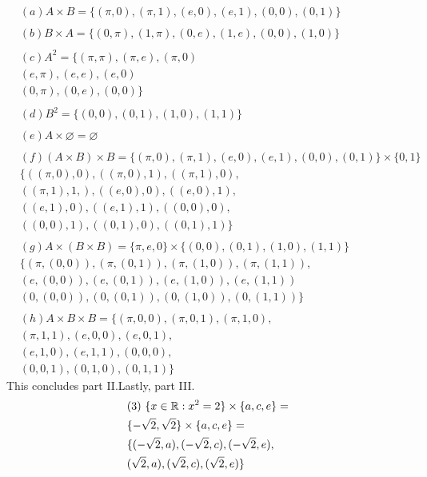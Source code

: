\begin{solution}
$$\begin{aligned}
    &(a) A\times B= \{ (\pi,0),(\pi,1),(e,0),(e,1),(0,0),(0,1) \}\\\\
    &(b) B\times A= \{ (0,\pi),(1,\pi),(0,e),(1,e),(0,0),(1,0) \}\\\\
    &(c) A^2= \{ (\pi,\pi), (\pi,e),(\pi,0)\\
    &(e,\pi),(e,e),(e,0)\\
    &(0,\pi),(0,e),(0,0) \}\\\\
    &(d) B^2= \{ (0,0),(0,1),(1,0),(1,1) \}\\\\
    &(e) A\times\varnothing=\varnothing\\\\
    &(f) (A\times B)\times B= \{ (\pi,0),(\pi,1),(e,0),(e,1),(0,0),(0,1) \}\times \{ 0,1 \}\\
    &\{  ((\pi,0),0), ((\pi,0),1), ((\pi,1),0), \\
    &((\pi,1),1,), ((e,0),0),((e,0),1),\\
    &((e,1),0),((e,1),1), ((0,0),0),\\
    &((0,0),1), ((0,1),0),((0,1),1)\}\\\\
    &(g) A\times (B\times B)= \{ \pi,e,0 \}\times \{ (0,0),(0,1),(1,0),(1,1) \}\\
    &\{ (\pi,(0,0)),(\pi,(0,1)),(\pi,(1,0)),(\pi,(1,1)),\\
    &(e,(0,0)),(e,(0,1)),(e,(1,0)),(e,(1,1))\\
    &(0,(0,0)),(0,(0,1)),(0,(1,0)),(0,(1,1)) \}\\\\
    &(h) A\times B\times B=\{ (\pi, 0,0),(\pi,0,1),(\pi,1,0),\\
    &(\pi,1,1),(e,0,0),(e,0,1),\\
    &(e,1,0),(e,1,1),(0,0,0),\\
    &(0,0,1),(0,1,0),(0,1,1) \}
\end{aligned}
$$
This concludes part II.\@ Lastly, part III.\@
$$
\begin{aligned}
    &(3)~ \{ x\in\R:x^2=2 \}\times \{ a,c,e \}=\\
    &\{ -\sqrt 2, \sqrt 2 \}\times \{ a,c,e \}=\\
    &\{ (-\sqrt 2, a),(-\sqrt 2, c),(-\sqrt 2, e),\\
    &(\sqrt 2, a),(\sqrt 2,c),(\sqrt 2, e)\}\\\\

\end{aligned}$$
\end{solution}
